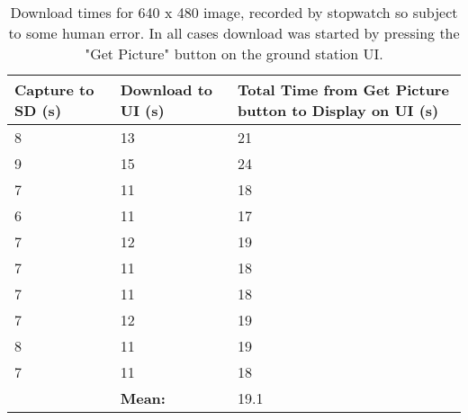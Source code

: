\begin{table}[!hbtp]

	\centering
	\begin{tabular}{ | p{3cm} | p{3cm} | p{4cm} | }
	\hline
	\textbf{Capture to SD (s)} & \textbf{Download to UI (s)} & 
	\textbf{Total Time from Get Picture button to Display on UI (s)} \\ \hline

	8 & 13  & 21 \\ \hline
	9 & 15  & 24 \\ \hline
	7 & 11  & 18 \\ \hline
	6 & 11  & 17 \\ \hline
	7 & 12  & 19 \\ \hline
	7 & 11  & 18 \\ \hline
	7 & 11  & 18 \\ \hline
	7 & 12  & 19 \\ \hline
	8 & 11  & 19 \\ \hline
	7 & 11  & 18 \\ \hline
	 & \textbf{Mean:} & 19.1 \\ \hline

	\end{tabular}
	\caption{Download times for 640 x 480 image, recorded by stopwatch so subject to some human error. In all cases download was started by pressing the "Get Picture" button on the ground station UI.}
	\label{table:download_time_test}
\end{table}

